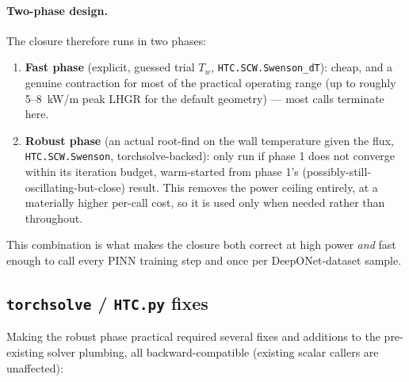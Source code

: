 \documentclass[11pt]{article}
\begin{document}
\paragraph{Two-phase design.} The closure therefore runs in two phases:
\begin{enumerate}
\item \textbf{Fast phase} (explicit, guessed trial $T_w$,
\texttt{HTC.SCW.Swenson\_dT}): cheap, and a genuine contraction for most
of the practical operating range (up to roughly 5--8~kW/m peak LHGR for
the default geometry) --- most calls terminate here.
\item \textbf{Robust phase} (an actual root-find on the wall temperature
given the flux, \texttt{HTC.SCW.Swenson}, torchsolve-backed): only run if
phase 1 does not converge within its iteration budget, warm-started from
phase 1's (possibly-still-oscillating-but-close) result. This removes the
power ceiling entirely, at a materially higher per-call cost, so it is
used only when needed rather than throughout.
\end{enumerate}
This combination is what makes the closure both correct at high power
\emph{and} fast enough to call every PINN training step and once per
DeepONet-dataset sample.

\subsection{\texttt{torchsolve} / \texttt{HTC.py} fixes}

Making the robust phase practical required several fixes and additions to
the pre-existing solver plumbing, all backward-compatible (existing
scalar callers are unaffected):
\end{document}
